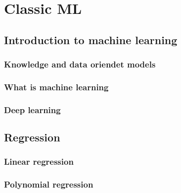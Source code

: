 \setchapterpreamble[u]{\margintoc}
\chapter[Classic approach to machine learning]{Classic ML\footnotemark[0]}


\section{Introduction to machine learning}

\subsection{Knowledge and data oriendet models}

\subsection{What is machine learning}

\subsection{Deep learning}


\section{Regression}

\subsection{Linear regression}

\subsection{Polynomial regression}

